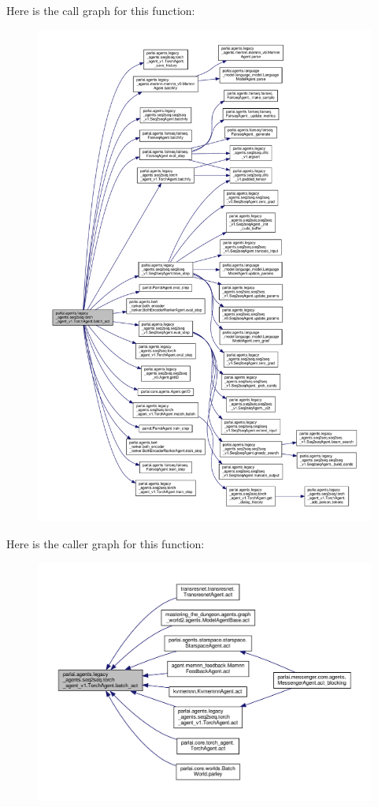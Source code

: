 Here is the call graph for this function\+:
\nopagebreak
\begin{figure}[H]
\begin{center}
\leavevmode
\includegraphics[width=350pt]{classparlai_1_1agents_1_1legacy__agents_1_1seq2seq_1_1torch__agent__v1_1_1TorchAgent_af3929c1bedc50a48dcf8d1184321f4f5_cgraph}
\end{center}
\end{figure}
Here is the caller graph for this function\+:
\nopagebreak
\begin{figure}[H]
\begin{center}
\leavevmode
\includegraphics[width=350pt]{classparlai_1_1agents_1_1legacy__agents_1_1seq2seq_1_1torch__agent__v1_1_1TorchAgent_af3929c1bedc50a48dcf8d1184321f4f5_icgraph}
\end{center}
\end{figure}
